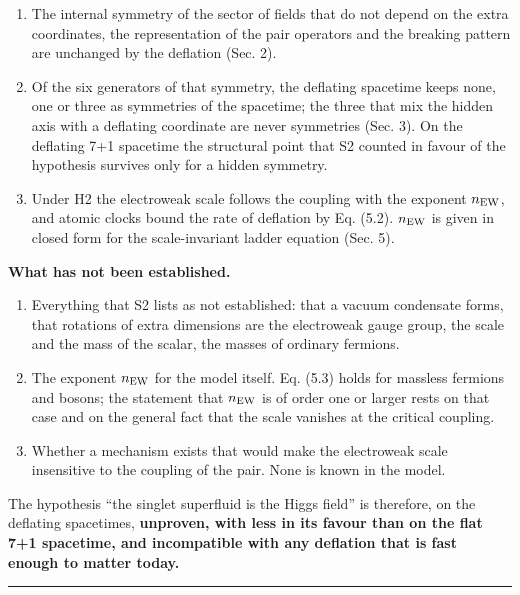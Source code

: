 \documentclass[
  10pt,
]{article}
\providecommand{\tightlist}{%
  \setlength{\itemsep}{0pt}\setlength{\parskip}{0pt}}
\begin{document}
\begin{enumerate}
\def\labelenumi{\arabic{enumi}.}
\tightlist
\item
  The internal symmetry of the sector of fields that do not depend on
  the extra coordinates, the representation of the pair operators and
  the breaking pattern are unchanged by the deflation (Sec. 2).
\item
  Of the six generators of that symmetry, the deflating spacetime keeps
  none, one or three as symmetries of the spacetime; the three that mix
  the hidden axis with a deflating coordinate are never symmetries (Sec.
  3). On the deflating 7+1 spacetime the structural point that S2
  counted in favour of the hypothesis survives only for a hidden
  symmetry.
\item
  Under H2 the electroweak scale follows the coupling with the exponent
  \(n_{\rm EW}\), and atomic clocks bound the rate of deflation by Eq.
  (5.2). \(n_{\rm EW}\) is given in closed form for the scale-invariant
  ladder equation (Sec. 5).
\end{enumerate}

\textbf{What has not been established.}

\begin{enumerate}
\def\labelenumi{\arabic{enumi}.}
\tightlist
\item
  Everything that S2 lists as not established: that a vacuum condensate
  forms, that rotations of extra dimensions are the electroweak gauge
  group, the scale and the mass of the scalar, the masses of ordinary
  fermions.
\item
  The exponent \(n_{\rm EW}\) for the model itself. Eq. (5.3) holds for
  massless fermions and bosons; the statement that \(n_{\rm EW}\) is of
  order one or larger rests on that case and on the general fact that
  the scale vanishes at the critical coupling.
\item
  Whether a mechanism exists that would make the electroweak scale
  insensitive to the coupling of the pair. None is known in the model.
\end{enumerate}

The hypothesis ``the singlet superfluid is the Higgs field'' is
therefore, on the deflating spacetimes, \textbf{unproven, with less in
its favour than on the flat 7+1 spacetime, and incompatible with any
deflation that is fast enough to matter today.}

\begin{center}\rule{0.5\linewidth}{0.5pt}\end{center}
\end{document}
